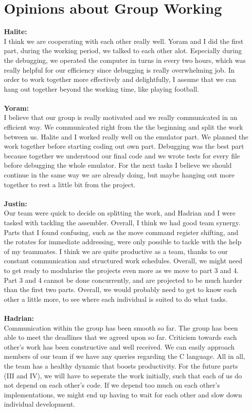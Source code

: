 \documentclass[a4paper]{article}
\begin{document}
\section{Opinions about Group Working}
\textbf{Halite:}\\
I think we are cooperating with each other really well. Yoram and I did the first part, during the working period, we talked to each other alot. Especially during the debugging, we operated the computer in turns in every two hours, which was really helpful for our efficiency since debugging is really overwhelming job. In order to work together more effectively and delightfully, I assume that we can hang out together beyond the working time, like playing football.\\
\\
\textbf{Yoram:}\\
I believe that our group is really motivated and we really communicated in an efficient way. We communicated right from the the beginning and split the work between us.
Halite and I worked really well on the emulator part. We planned the work together before starting coding out own part. Debugging was the best part because together we understood our final code and we wrote tests for every file before debugging the whole emulator. For the next tasks I believe we should continue in the same way we are already doing, but maybe hanging out more together to rest a little bit from the project.
\\\\
\textbf{Justin:}\\
Our team were quick to decide on splitting the work, and Hadrian and I were tasked with tackling the assembler. Overall, I think we had good team synergy. Parts that I found confusing, such as the move command register shifting, and the rotates for immediate addressing, were only possible to tackle with the help of my teammates. I think we are quite productive as a team, thanks to our constant communication and structured work schedules. Overall, we might need to get ready to modularise the projects even more as we move to part 3 and 4. Part 3 and 4 cannot be done concurrently, and are projected to be much harder than the first two parts. Overall, we would probably need to get to know each other a little more, to see where each individual is suited to do what tasks.\\
\\
\textbf{Hadrian:}\\
Communication within the group has been smooth so far. The group has been able to meet the deadlines that we agreed upon so far. Criticism towards each other's work has been constructive and well received. We can easily approach members of our team if we have any queries regarding the C language. All in all, the team has a healthy dynamic that boosts productivity. For the future parts (III and IV), we will have to seperate the work initially, such that each of us do not depend on each other's code. If we depend too much on each other's implementations, we might end up having to wait for each other and slow down individual development.
\end{document}
